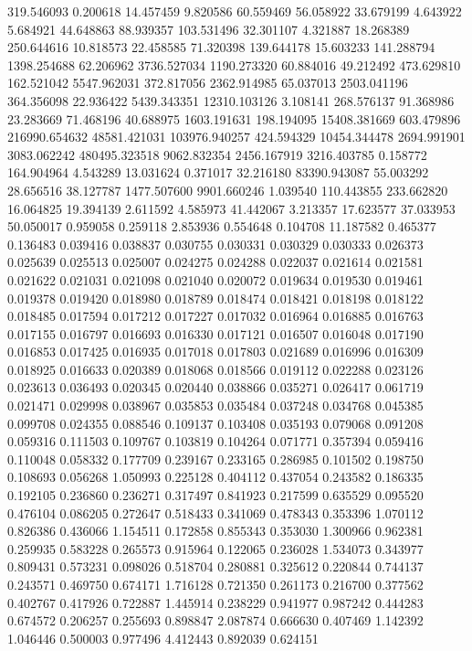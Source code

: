 319.546093
0.200618
14.457459
9.820586
60.559469
56.058922
33.679199
4.643922
5.684921
44.648863
88.939357
103.531496
32.301107
4.321887
18.268389
250.644616
10.818573
22.458585
71.320398
139.644178
15.603233
141.288794
1398.254688
62.206962
3736.527034
1190.273320
60.884016
49.212492
473.629810
162.521042
5547.962031
372.817056
2362.914985
65.037013
2503.041196
364.356098
22.936422
5439.343351
12310.103126
3.108141
268.576137
91.368986
23.283669
71.468196
40.688975
1603.191631
198.194095
15408.381669
603.479896
216990.654632
48581.421031
103976.940257
424.594329
10454.344478
2694.991901
3083.062242
480495.323518
9062.832354
2456.167919
3216.403785
0.158772
164.904964
4.543289
13.031624
0.371017
32.216180
83390.943087
55.003292
28.656516
38.127787
1477.507600
9901.660246
1.039540
110.443855
233.662820
16.064825
19.394139
2.611592
4.585973
41.442067
3.213357
17.623577
37.033953
50.050017
0.959058
0.259118
2.853936
0.554648
0.104708
11.187582
0.465377
0.136483
0.039416
0.038837
0.030755
0.030331
0.030329
0.030333
0.026373
0.025639
0.025513
0.025007
0.024275
0.024288
0.022037
0.021614
0.021581
0.021622
0.021031
0.021098
0.021040
0.020072
0.019634
0.019530
0.019461
0.019378
0.019420
0.018980
0.018789
0.018474
0.018421
0.018198
0.018122
0.018485
0.017594
0.017212
0.017227
0.017032
0.016964
0.016885
0.016763
0.017155
0.016797
0.016693
0.016330
0.017121
0.016507
0.016048
0.017190
0.016853
0.017425
0.016935
0.017018
0.017803
0.021689
0.016996
0.016309
0.018925
0.016633
0.020389
0.018068
0.018566
0.019112
0.022288
0.023126
0.023613
0.036493
0.020345
0.020440
0.038866
0.035271
0.026417
0.061719
0.021471
0.029998
0.038967
0.035853
0.035484
0.037248
0.034768
0.045385
0.099708
0.024355
0.088546
0.109137
0.103408
0.035193
0.079068
0.091208
0.059316
0.111503
0.109767
0.103819
0.104264
0.071771
0.357394
0.059416
0.110048
0.058332
0.177709
0.239167
0.233165
0.286985
0.101502
0.198750
0.108693
0.056268
1.050993
0.225128
0.404112
0.437054
0.243582
0.186335
0.192105
0.236860
0.236271
0.317497
0.841923
0.217599
0.635529
0.095520
0.476104
0.086205
0.272647
0.518433
0.341069
0.478343
0.353396
1.070112
0.826386
0.436066
1.154511
0.172858
0.855343
0.353030
1.300966
0.962381
0.259935
0.583228
0.265573
0.915964
0.122065
0.236028
1.534073
0.343977
0.809431
0.573231
0.098026
0.518704
0.280881
0.325612
0.220844
0.744137
0.243571
0.469750
0.674171
1.716128
0.721350
0.261173
0.216700
0.377562
0.402767
0.417926
0.722887
1.445914
0.238229
0.941977
0.987242
0.444283
0.674572
0.206257
0.255693
0.898847
2.087874
0.666630
0.407469
1.142392
1.046446
0.500003
0.977496
4.412443
0.892039
0.624151
